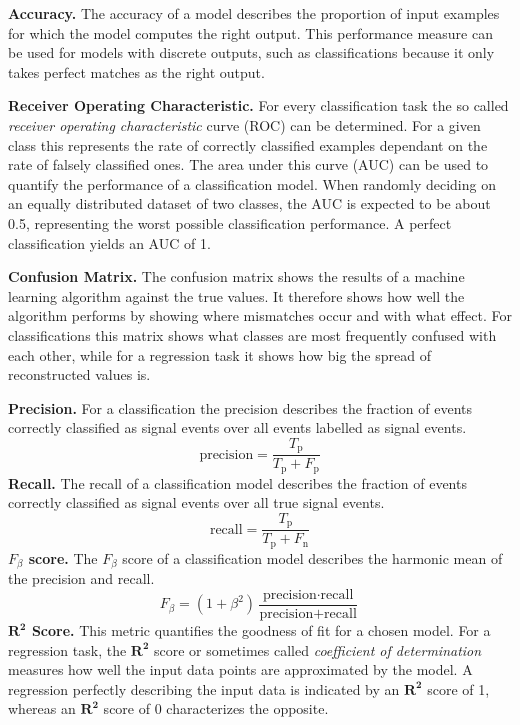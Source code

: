 \textbf{Accuracy.} The accuracy of a model describes the proportion of input
examples for which the model computes the right output. This performance
measure can be used for models with discrete outputs, such as classifications
because it only takes perfect matches as the right output.

\textbf{Receiver Operating Characteristic.} For every classification task the
so called \textit{receiver operating characteristic} curve (ROC) can be
determined. For a given class this represents the rate of correctly classified
examples dependant on the rate of falsely classified ones. The area under this
curve (AUC) can be used to quantify the performance of a classification model.
When randomly deciding on an equally distributed dataset of two classes, the
AUC is expected to be about \num{0.5}, representing the worst possible
classification performance. A perfect classification yields an AUC of \num{1}.

\textbf{Confusion Matrix.} The confusion matrix shows the results of a machine
learning algorithm against the true values. It therefore shows how well the
algorithm performs by showing where mismatches occur and with what effect. For
classifications this matrix shows what classes are most frequently confused
with each other, while for a regression task it shows how big the spread of
reconstructed values is.

\textbf{Precision.} For a classification the precision describes the fraction
of events correctly classified as signal events over all events labelled as
signal events.
%
\begin{equation}
  \text{precision} = \frac{T_{\text{p}}}{T_{\text{p}} + F_{\text{p}}}
\end{equation}
%
\textbf{Recall.} The recall of a classification model describes the fraction
of events correctly classified as signal events over all true signal events.
%
\begin{equation}
  \text{recall} = \frac{T_{\text{p}}}{T_{\text{p}} + F_{\text{n}}}
\end{equation}
%
\textbf{$F_\beta$ score.} The $F_\beta$ score of a classification model describes the harmonic mean of the precision and recall.
%
\begin{equation}
  F_\beta = (1 + \beta^2)\frac{\text{precision} \cdot \text{recall}}{\text{precision} + \text{recall}}
\end{equation}
%
\textbf{$\symbf{R^2}$ Score.} This metric quantifies the goodness of fit for a
chosen model. For a regression task, the $\symbf{R^2}$ score or sometimes
called \textit{coefficient of determination} measures how well the input data
points are approximated by the model. A regression perfectly describing the
input data is indicated by an $\symbf{R^2}$ score of 1, whereas an
$\symbf{R^2}$ score of \num{0} characterizes the opposite.
